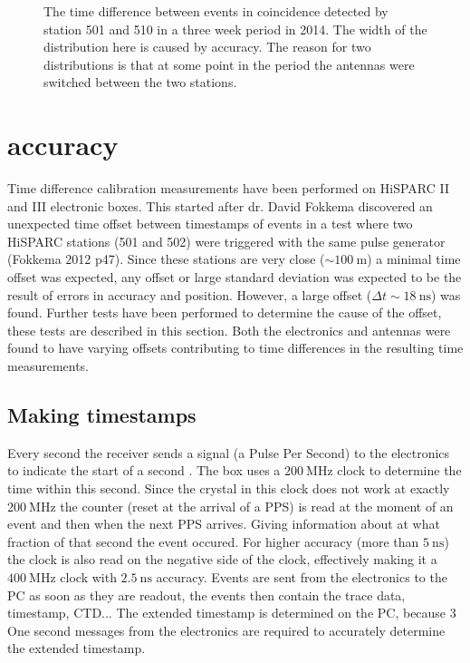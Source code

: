 \begin{figure}
    \centering
    
    \caption{ The
             time difference between events in coincidence detected by
             station 501 and 510 in a three week period in 2014. The
             width of the distribution here is caused by \gps accuracy.
             The reason for two distributions is that at some point in
             the period the \gps antennas were switched between the two
             stations.}
    \label{fig:station_offsets_501_510}
\end{figure}


\section{\gps accuracy}
\label{sec:gps_accuracy}

Time difference calibration measurements have been performed on
HiSPARC II and III electronic boxes. This started after dr. David
Fokkema discovered an unexpected time offset between timestamps of
events in a test where two HiSPARC stations (501 and 502) were triggered
with the same pulse generator (Fokkema 2012 p47). Since these stations
are very close ($\sim\SI{100}{\meter}$) a minimal time offset was
expected, any offset or large standard deviation was expected to be the
result of errors in \gps accuracy and position. However, a large offset
($\Delta t \sim\SI{18}{\nano\second}$) was found. Further tests have
been performed to determine the cause of the offset, these tests are
described in this section. Both the \hisparc electronics and \gps
antennas were found to have varying offsets contributing to time
differences in the resulting time measurements.


\subsection{Making timestamps}
\label{sub:gps_timestamps}

Every second the \gps receiver sends a signal (a Pulse Per Second) to
the \hisparc electronics to indicate the start of a second
\cite{messages}. The \hisparc box uses a $\SI{200}{\mega\hertz}$ clock
to determine the time within this second. Since the crystal in this
clock does not work at exactly $\SI{200}{\mega\hertz}$ the counter
(reset at the arrival of a PPS) is read at the moment of an event and
then when the next PPS arrives. Giving information about at what
fraction of that second the event occured. For higher accuracy (more
than $\SI{5}{\nano\second}$) the clock is also read on the negative side
of the clock, effectively making it a $\SI{400}{\mega\hertz}$ clock with
$\SI{2.5}{\nano\second}$ accuracy. Events are sent from the \hisparc
electronics to the PC as soon as they are readout, the events then
contain the trace data, timestamp, CTD... The extended timestamp is
determined on the PC, because 3 One second messages from the electronics are required to accurately determine the extended timestamp.


